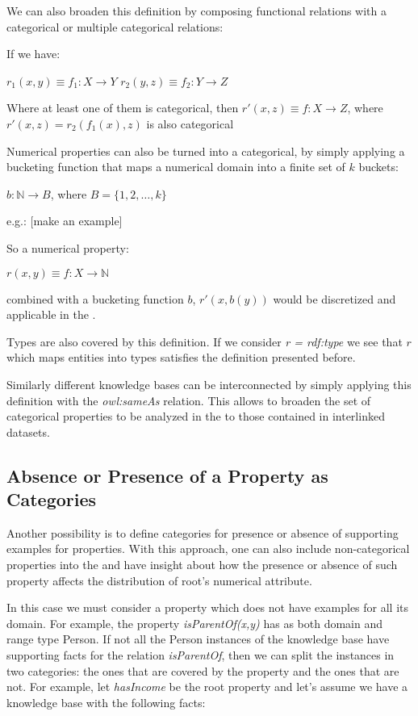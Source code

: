 We can also broaden this definition by composing functional relations with a categorical or multiple categorical
relations:

If we have:

$r_1(x,y) \equiv f_1 : X \rightarrow Y$ \newline
$r_2(y,z) \equiv f_2 : Y \rightarrow Z$ 

Where at least one of them is categorical, then $r'(x,z) \equiv f : X \rightarrow Z$, where $r'(x,z)=r_2(f_1(x),z)$ is also categorical


Numerical properties can also be turned into a categorical, by simply applying a bucketing function that maps a
numerical domain into a finite set of $k$ buckets:

$b: \mathbb{N} \rightarrow B$, where $B=\{1,2,\dots ,k \}$

e.g.: [make an example]

So a numerical property:

$r(x,y) \equiv f : X \rightarrow \mathbb{N}$ 

combined with a bucketing function $b$, $r'(x,b(y))$ would be discretized and applicable in the \graphname.

Types are also covered by this definition. If we consider \emph{r = rdf:type} we see that $r$ which maps entities into
types satisfies the definition presented before.

Similarly different knowledge bases can be interconnected by simply applying this definition with the \emph{owl:sameAs}
relation. This allows to broaden the set of categorical properties to be analyzed in the \graphname to those contained
in interlinked datasets.

\subsection{Absence or Presence of a Property as Categories}

Another possibility is to define categories for presence or absence of supporting examples for properties. With this
approach, one can also
include non-categorical properties into the \graphname and have insight about how the presence or absence of such
property affects the distribution of root's numerical attribute.

In this case we must consider a property which does not have examples for all its domain. For example, the property
\emph{isParentOf(x,y)} has as both domain and range type Person. If not all the Person instances of the knowledge base
have supporting facts for the relation \emph{isParentOf}, then we can
split the instances in two categories: the ones that are covered by the property and the ones that are not. For example,
let \emph{hasIncome} be the root property and let's assume we have a knowledge base with the following facts:

